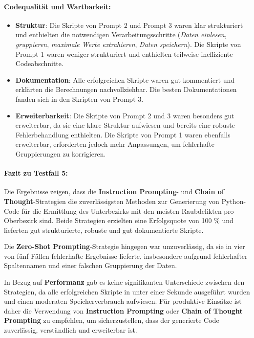 \documentclass[11pt,a4paper]{article}
\begin{document}
\paragraph{Codequalität und Wartbarkeit:}
\begin{itemize}
    \item \textbf{Struktur}: Die Skripte von Prompt 2 und Prompt 3 waren klar strukturiert und enthielten die notwendigen Verarbeitungsschritte (\textit{Daten einlesen}, \textit{gruppieren}, \textit{maximale Werte extrahieren}, \textit{Daten speichern}). Die Skripte von Prompt 1 waren weniger strukturiert und enthielten teilweise ineffiziente Codeabschnitte.
    \item \textbf{Dokumentation}: Alle erfolgreichen Skripte waren gut kommentiert und erklärten die Berechnungen nachvollziehbar. Die besten Dokumentationen fanden sich in den Skripten von Prompt 3.
    \item \textbf{Erweiterbarkeit}: Die Skripte von Prompt 2 und 3 waren besonders gut erweiterbar, da sie eine klare Struktur aufwiesen und bereits eine robuste Fehlerbehandlung enthielten. Die Skripte von Prompt 1 waren ebenfalls erweiterbar, erforderten jedoch mehr Anpassungen, um fehlerhafte Gruppierungen zu korrigieren.
\end{itemize}

\paragraph{Fazit zu Testfall 5:}
Die Ergebnisse zeigen, dass die \textbf{Instruction Prompting}- und \textbf{Chain of Thought}-Strategien die zuverlässigsten Methoden zur Generierung von Python-Code für die Ermittlung des Unterbezirks mit den meisten Raubdelikten pro Oberbezirk sind. Beide Strategien erzielten eine Erfolgsquote von 100 \% und lieferten gut strukturierte, robuste und gut dokumentierte Skripte.

Die \textbf{Zero-Shot Prompting}-Strategie hingegen war unzuverlässig, da sie in vier von fünf Fällen fehlerhafte Ergebnisse lieferte, insbesondere aufgrund fehlerhafter Spaltennamen und einer falschen Gruppierung der Daten.

In Bezug auf \textbf{Performanz} gab es keine signifikanten Unterschiede zwischen den Strategien, da alle erfolgreichen Skripte in unter einer Sekunde ausgeführt wurden und einen moderaten Speicherverbrauch aufwiesen. Für produktive Einsätze ist daher die Verwendung von \textbf{Instruction Prompting} oder \textbf{Chain of Thought Prompting} zu empfehlen, um sicherzustellen, dass der generierte Code zuverlässig, verständlich und erweiterbar ist.
\end{document}
